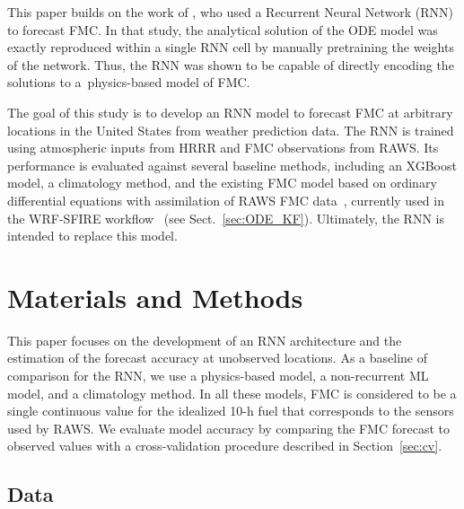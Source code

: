 \documentclass[fire,article,submit,pdftex,moreauthors]{Definitions/mdpi}
\begin{document}
This paper builds on the work of \citet{Mandel-2023-BFM}, who used a Recurrent Neural Network (RNN) to forecast FMC. In that study, the analytical solution of the ODE model was exactly reproduced within a single RNN cell by manually pretraining the weights of the network. Thus, the RNN was shown to be capable of directly encoding the solutions to a~physics-based model of FMC.

The goal of this study is to develop an RNN model to forecast FMC at arbitrary locations in the United States from weather prediction data. The RNN is trained using atmospheric inputs from HRRR and FMC observations from RAWS. Its performance is evaluated against several baseline methods, including an XGBoost model, a climatology method, and the existing FMC model based on ordinary differential equations with assimilation of RAWS FMC data~\citep{Vejmelka-2014-DAF,Vejmelka-2016-DAD}, currently used in the WRF-SFIRE workflow~\citep{Mandel-2019-IDH} (see Sect.~\ref{sec:ODE_KF}). Ultimately, the RNN is intended to replace this model.

\section{Materials and Methods}
This paper focuses on the development of an RNN architecture and the estimation of the forecast accuracy at unobserved locations. As a baseline of comparison for the RNN, we use a physics-based model, a non-recurrent ML model, and a climatology method. In all these models, FMC is considered to be a single continuous value for the idealized 10-h fuel that corresponds to the sensors used by RAWS. We evaluate model accuracy by comparing the FMC forecast to observed values with a cross-validation procedure described in Section~\ref{sec:cv}. 

\subsection{Data}
\end{document}
